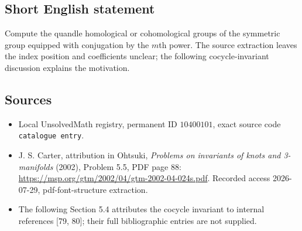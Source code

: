 \documentclass[11pt]{article}
\begin{document}
\subsection{Short English statement}
Compute the quandle homological or cohomological groups of the symmetric group equipped with conjugation by the \(m\)th power. The source extraction leaves the index position and coefficients unclear; the following cocycle-invariant discussion explains the motivation.
\subsection{Sources}
\begin{itemize}
\item Local UnsolvedMath registry, permanent ID \(10400101\), exact source code \texttt{catalogue entry}.
\item J. S. Carter, attribution in Ohtsuki, \emph{Problems on invariants of knots and 3-manifolds} (2002), Problem 5.5, PDF page 88: \url{https://msp.org/gtm/2002/04/gtm-2002-04-024s.pdf}. Recorded access 2026-07-29, pdf-font-structure extraction.
\item The following Section 5.4 attributes the cocycle invariant to internal references [79, 80]; their full bibliographic entries are not supplied.
\end{itemize}
\end{document}
